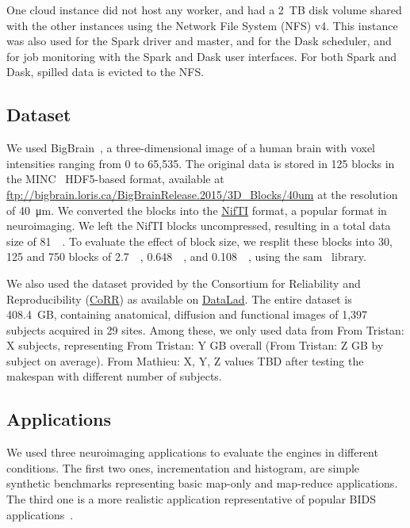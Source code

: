 \documentclass[conference]{IEEEtran}
\newcommand{\TG}[1]{\color{cyan}From Tristan: #1 \color{black}}
\newcommand{\MD}[1]{\color{magenta}From Mathieu: #1 \color{black}}
\begin{document}
 One cloud instance did not host any worker, and had a 2~TB disk volume
 shared with the other instances using the Network File System (NFS) v4.
 This instance was also used for the Spark driver and master, and for the
 Dask scheduler, and for job monitoring with the Spark and Dask user
 interfaces. For both Spark and Dask, spilled data is evicted to the NFS.

\subsection{Dataset}

We used BigBrain~\cite{Amunts:13}, a three-dimensional image of a human
brain with voxel intensities ranging from 0 to 65,535. The original data is
stored in 125 blocks in the MINC~\cite{minc} HDF5-based format, available
at \url{ftp://bigbrain.loris.ca/BigBrainRelease.2015/3D_Blocks/40um} at the
resolution of \SI{40}{\micro\metre}. We converted the blocks into the
\href{https://nifti.nimh.nih.gov/nifti-1}{NifTI} format, a popular format
in neuroimaging. We left the NifTI blocks uncompressed, resulting in 
a total data size of \SI{81}{\giga\byte}. 
To evaluate the effect of block size, we resplit these blocks into 30, 125 and 750 blocks of 
\SI{2.7}{\giga\byte}, \SI{0.648}{\giga\byte}, and
\SI{0.108}{\giga\byte}, using the sam~\cite{sam} library.

We also used the dataset provided by the Consortium for Reliability and
Reproducibility
(\href{http://fcon_1000.projects.nitrc.org/indi/CoRR/html/}{CoRR}) as
available on
\href{http://datasets.datalad.org/?dir=/corr/RawDataBIDS}{DataLad}. The
entire dataset is 408.4~GB, containing anatomical, diffusion and functional
images of 1,397 subjects acquired in 29 sites. Among these, we only used
data from \TG{X} subjects, representing \TG{Y}GB overall (\TG{Z}GB by
subject on average).
\MD{X, Y, Z values TBD after testing the makespan with different number of subjects.}


\subsection{Applications}

We used three neuroimaging applications to evaluate the engines in
different conditions. The first two ones, incrementation and histogram, are
simple synthetic benchmarks representing basic map-only and map-reduce applications.
The third one is a more realistic application representative of popular
BIDS applications~\cite{gorgolewski2017bids}. 
\end{document}
